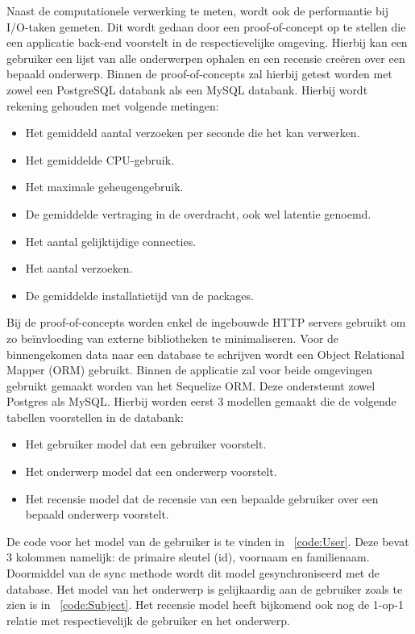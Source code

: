 Naast de computationele verwerking te meten, wordt ook de performantie bij I/O-taken gemeten.
Dit wordt gedaan door een proof-of-concept op te stellen die een applicatie back-end voorstelt in de respectievelijke omgeving.
Hierbij kan een gebruiker een lijst van alle onderwerpen ophalen en een recensie creëren over een bepaald onderwerp. 
Binnen de proof-of-concepts zal hierbij getest worden met zowel een PostgreSQL databank als een MySQL databank.
Hierbij wordt rekening gehouden met volgende metingen:
\begin{itemize}
    \item Het gemiddeld aantal verzoeken per seconde die het kan verwerken.
    \item Het gemiddelde CPU-gebruik.
    \item Het maximale geheugengebruik.
    \item De gemiddelde vertraging in de overdracht, ook wel latentie genoemd.
    \item Het aantal gelijktijdige connecties.
    \item Het aantal verzoeken.
    \item De gemiddelde installatietijd van de packages.
\end{itemize}
Bij de proof-of-concepts worden enkel de ingebouwde HTTP servers gebruikt om zo beïnvloeding van externe bibliotheken te minimaliseren.
Voor de binnengekomen data naar een database te schrijven wordt een Object Relational Mapper (ORM) gebruikt.
Binnen de applicatie zal voor beide omgevingen gebruikt gemaakt worden van het Sequelize ORM. Deze ondersteunt zowel Postgres als MySQL.
Hierbij worden eerst 3 modellen gemaakt die de volgende tabellen voorstellen in de databank:
\begin{itemize}
  \item Het gebruiker model dat een gebruiker voorstelt.
  \item Het onderwerp model dat een onderwerp voorstelt.
  \item Het recensie model dat de recensie van een bepaalde gebruiker over een bepaald onderwerp voorstelt.
\end{itemize}
De code voor het model van de gebruiker is te vinden in ~\ref{code:User}. Deze bevat 3 kolommen namelijk: de primaire sleutel (id), voornaam en familienaam.
Doormiddel van de sync methode wordt dit model gesynchroniseerd met de database. 
Het model van het onderwerp is gelijkaardig aan de gebruiker zoals te zien is in ~\ref{code:Subject}. Het recensie model heeft bijkomend 
ook nog de 1-op-1 relatie met respectievelijk de gebruiker en het onderwerp.
